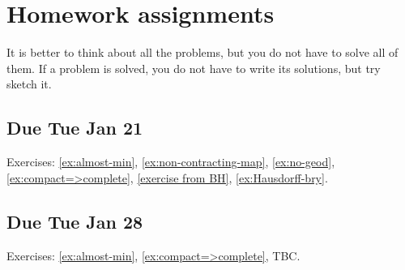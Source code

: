 \addtocounter{chapter}{-1}
\chapter{Homework assignments}

It is better to think about all the problems, but you do not have to solve all of them.
If a problem is solved, you do not have to write its solutions, but try sketch it.

\section{Due Tue Jan 21}

Exercises: \ref{ex:almost-min}, \ref{ex:non-contracting-map}, \ref{ex:no-geod}, \ref{ex:compact=>complete}, \ref{exercise from BH}, \ref{ex:Hausdorff-bry}.

\section{Due Tue Jan 28}

Exercises: \ref{ex:almost-min}, \ref{ex:compact=>complete}, TBC.

